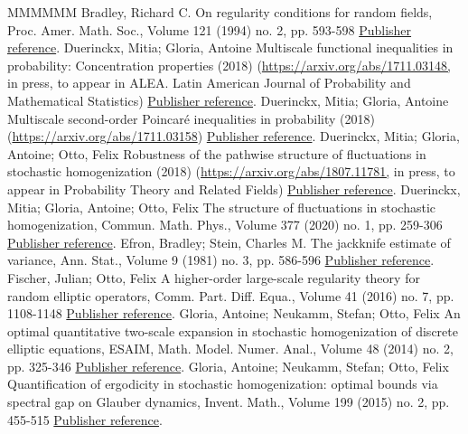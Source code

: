 \begin{thebibliography}{MMMMMM}
 Bradley, Richard C. On regularity conditions for random fields, Proc. Amer. Math. Soc., Volume 121 (1994) no. 2, pp. 593-598 \href{https://ahl.centre-mersenne.org/item/AHL_2020__3__825_0/#Bradley-94}{Publisher reference}.
 Duerinckx, Mitia; Gloria, Antoine Multiscale functional inequalities in probability: Concentration properties (2018) (\url{https://arxiv.org/abs/1711.03148,} in press, to appear in ALEA. Latin American Journal of Probability and Mathematical Statistics) \href{https://ahl.centre-mersenne.org/item/AHL_2020__3__825_0/#DG1}{Publisher reference}.
 Duerinckx, Mitia; Gloria, Antoine Multiscale second-order Poincaré inequalities in probability (2018) (\url{https://arxiv.org/abs/1711.03158}) \href{https://ahl.centre-mersenne.org/item/AHL_2020__3__825_0/#DG3}{Publisher reference}.
 Duerinckx, Mitia; Gloria, Antoine; Otto, Felix Robustness of the pathwise structure of fluctuations in stochastic homogenization (2018) (\url{https://arxiv.org/abs/1807.11781,} in press, to appear in Probability Theory and Related Fields) \href{https://ahl.centre-mersenne.org/item/AHL_2020__3__825_0/#DGO2}{Publisher reference}.
 Duerinckx, Mitia; Gloria, Antoine; Otto, Felix The structure of fluctuations in stochastic homogenization, Commun. Math. Phys., Volume 377 (2020) no. 1, pp. 259-306 \href{https://ahl.centre-mersenne.org/item/AHL_2020__3__825_0/#DGO1}{Publisher reference}.
 Efron, Bradley; Stein, Charles M. The jackknife estimate of variance, Ann. Stat., Volume 9 (1981) no. 3, pp. 586-596 \href{https://ahl.centre-mersenne.org/item/AHL_2020__3__825_0/#Efron-Stein-81}{Publisher reference}.
 Fischer, Julian; Otto, Felix A higher-order large-scale regularity theory for random elliptic operators, Comm. Part. Diff. Equa., Volume 41 (2016) no. 7, pp. 1108-1148 \href{https://ahl.centre-mersenne.org/item/AHL_2020__3__825_0/#Fischer-Otto-16}{Publisher reference}.
 Gloria, Antoine; Neukamm, Stefan; Otto, Felix An optimal quantitative two-scale expansion in stochastic homogenization of discrete elliptic equations, ESAIM, Math. Model. Numer. Anal., Volume 48 (2014) no. 2, pp. 325-346 \href{https://ahl.centre-mersenne.org/item/AHL_2020__3__825_0/#Glotto-Neukamm-14}{Publisher reference}.
 Gloria, Antoine; Neukamm, Stefan; Otto, Felix Quantification of ergodicity in stochastic homogenization: optimal bounds via spectral gap on Glauber dynamics, Invent. Math., Volume 199 (2015) no. 2, pp. 455-515 \href{https://ahl.centre-mersenne.org/item/AHL_2020__3__825_0/#GNO-I}{Publisher reference}.

\end{thebibliography}

